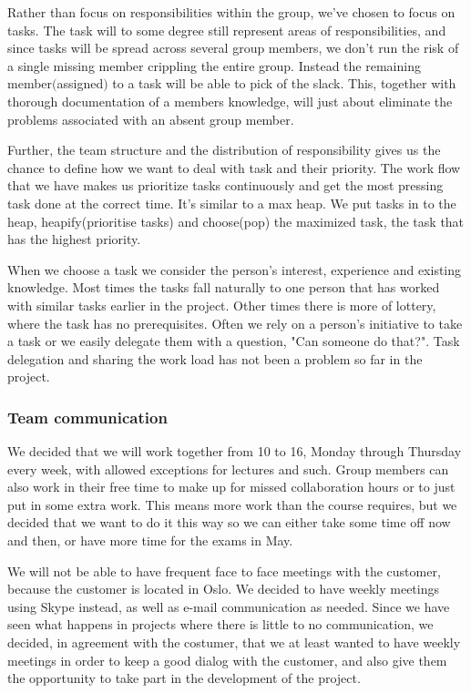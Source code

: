     Rather than focus on responsibilities within the group, we've chosen to focus on tasks.
The task will to some degree still represent areas of responsibilities, and since tasks will be spread across several group members, we don't run the risk of  a single missing member crippling the entire group. Instead the remaining member$($assigned$)$ to a task will be able to pick of the slack. This, together with thorough documentation of a members knowledge, will just about eliminate the problems associated with an absent group member.
        
    Further, the team structure and the distribution of responsibility gives us the chance to define how we want to deal with task and their priority. The work flow that we have makes us prioritize tasks continuously and get the most pressing task done at the correct time. It's similar to a max heap. We put tasks in to the heap, heapify(prioritise tasks) and choose(pop) the maximized task, the task that has the highest priority. 
    
    When we choose a task we consider the person's interest, experience and existing knowledge. Most times the tasks fall naturally to one person that has worked with similar tasks earlier in the project. Other times there is more of lottery, where the task has no prerequisites. Often we rely on a person's initiative to take a task or we easily delegate them with a question, "Can someone do that?". Task delegation and sharing the work load has not been a problem so far in the project.
    
    
    \subsubsection{Team communication}\label{Team communication}
    We decided that we will work together from 10 to 16, Monday through Thursday every week, with allowed exceptions for lectures and such. Group members can also work in their free time to make up for missed collaboration hours or to just put in some extra work. This means more work than the course requires, but we decided that we want to do it this way so we can either take some time off now and then, or have more time for the exams in May.

    We will not be able to have frequent face to face meetings with the customer, because the customer is located in Oslo. We decided to have weekly meetings using Skype instead, as well as e-mail communication as needed. Since we have seen what happens in projects where there is little to no communication, we decided, in agreement with the costumer, that we at least wanted to have weekly meetings in order to keep a good dialog with the customer, and also give them the opportunity to take part in the development of the project. 
    
